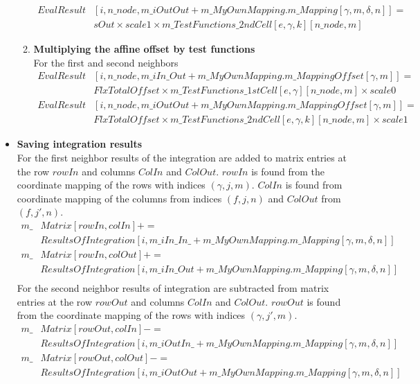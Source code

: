 \documentclass[BoSSSForSolvingConservationLaws.tex]{subfiles}
\begin{document}
\begin{itemize}
\begin{enumerate}
\begin{align*}
EvalResult&[i, n\_node, m\_iOutOut + m\_MyOwnMapping.m\_Mapping[\gamma, m, \delta, n]] =\\ &sOut \times scale1 \times m\_TestFunctions\_2ndCell[e, \gamma, k][n\_node,m]
\end{align*}
\item \textbf{Multiplying the affine offset by test functions}\\
\label{EndOfLoopEdge}
For the first and second neighbors
\begin{align*}
EvalResult&[i, n\_node, m\_iIn\_Out + m\_MyOwnMapping.m\_MappingOffset[\gamma, m]] =\\ &FlxTotalOffset \times m\_TestFunctions\_1stCell[e, \gamma][n\_node,m] \times scale0\\
EvalResult&[i, n\_node, m\_iOutOut + m\_MyOwnMapping.m\_MappingOffset[\gamma, m]] =\\ &FlxTotalOffset \times m\_TestFunctions\_2ndCell[e, \gamma, k][n\_node,m] \times scale1
\end{align*}
\end{enumerate}
\item \textbf{Saving integration results}\\
For the first neighbor results of the integration are added to matrix entries at the row $rowIn$ and columns $ColIn$ and $ColOut$. $rowIn$ is found from the coordinate mapping of the rows with indices $(\gamma, j, m)$. $ColIn$ is found from coordinate mapping of the columns from indices $(f,j,n)$ and $ColOut$ from $(f,j',n)$.
\begin{align*}
m\_&Matrix[rowIn, colIn] +=\\ &ResultsOfIntegration[i, m\_iIn\_In\_ + m\_MyOwnMapping.m\_Mapping[\gamma, m, \delta, n]]\\
m\_&Matrix[rowIn, colOut] +=\\ &ResultsOfIntegration[i, m\_iIn\_Out + m\_MyOwnMapping.m\_Mapping[\gamma, m, \delta, n]]\\
\end{align*}
For the second neighbor results of integration are subtracted from matrix entries at the row $rowOut$ and columns $ColIn$ and $ColOut$. $rowOut$ is found from the coordinate mapping of the rows with indices $(\gamma, j', m)$.
\begin{align*}
m\_&Matrix[rowOut, colIn] -=\\ &ResultsOfIntegration[i, m\_iOutIn\_ + m\_MyOwnMapping.m\_Mapping[\gamma, m, \delta, n]]\\
m\_&Matrix[rowOut, colOut] -=\\ &ResultsOfIntegration[i, m\_iOutOut + m\_MyOwnMapping.m\_Mapping[\gamma, m, \delta, n]]\\

\end{align*}
\end{itemize}
\end{document}

